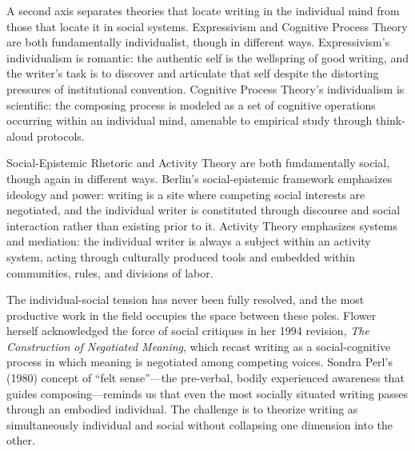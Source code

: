 \documentclass[12pt]{article}
\begin{document}
A second axis separates theories that locate writing in the individual mind from those that locate it in social systems. Expressivism and Cognitive Process Theory are both fundamentally individualist, though in different ways. Expressivism's individualism is romantic: the authentic self is the wellspring of good writing, and the writer's task is to discover and articulate that self despite the distorting pressures of institutional convention. Cognitive Process Theory's individualism is scientific: the composing process is modeled as a set of cognitive operations occurring within an individual mind, amenable to empirical study through think-aloud protocols.

Social-Epistemic Rhetoric and Activity Theory are both fundamentally social, though again in different ways. Berlin's social-epistemic framework emphasizes ideology and power: writing is a site where competing social interests are negotiated, and the individual writer is constituted through discourse and social interaction rather than existing prior to it. Activity Theory emphasizes systems and mediation: the individual writer is always a subject within an activity system, acting through culturally produced tools and embedded within communities, rules, and divisions of labor.

The individual-social tension has never been fully resolved, and the most productive work in the field occupies the space between these poles. Flower herself acknowledged the force of social critiques in her 1994 revision, \textit{The Construction of Negotiated Meaning}, which recast writing as a social-cognitive process in which meaning is negotiated among competing voices. Sondra Perl's (1980) concept of ``felt sense''---the pre-verbal, bodily experienced awareness that guides composing---reminds us that even the most socially situated writing passes through an embodied individual. The challenge is to theorize writing as simultaneously individual and social without collapsing one dimension into the other.
\end{document}
